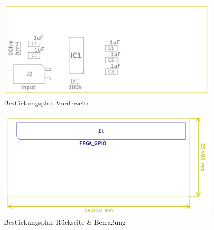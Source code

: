 \begin{figure}[H]
\begin{center}
\includegraphics[width = 15cm]{SAUER/Grafiken/Prot1/FFAB.png}
\caption{Bestückungsplan Vorderseite}
\end{center}
\end{figure}
\begin{figure}[H]
\begin{center}
\includegraphics[width = 15cm]{SAUER/Grafiken/Prot1/BFAB.png}
\caption{Bestückungsplan Rückseite \& Bemaßung}
\label{Prot1_BFAB}
\end{center}
\end{figure}